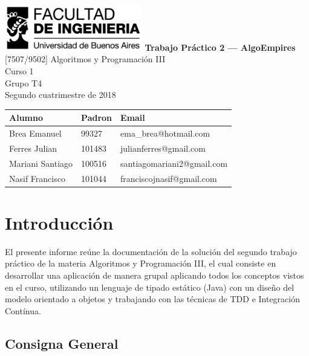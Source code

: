 \documentclass[titlepage,a4paper]{article}
\begin{document}
\begin{titlepage} %
	\hfill\includegraphics[width=6cm]{logofiuba.jpg}
    \centering
    \vfill
    \Huge \textbf{Trabajo Práctico 2 — AlgoEmpires}
    \vskip2cm
    \Large [7507/9502] Algoritmos y Programación III\\
    Curso 1 \\ %
    Grupo T4 \\
    Segundo cuatrimestre de 2018 
    \vfill 
   
    \begin{tabular}{|l|l|l|}
    		\hline
    		Alumno           & Padron & Email                      \\ \hline
    		Brea Emanuel     & 99327  & ema\_brea@hotmail.com      \\ \hline
    		Ferres Julian    & 101483 & julianferres@gmail.com     \\ \hline
    		Mariani Santiago & 100516 & santiagomariani2@gmail.com \\ \hline
    		Nasif  Francisco & 101044 & franciscojnasif@gmail.com  \\ \hline
    \end{tabular}  
  	  	
    \vfill
    \vfill
\end{titlepage}

\tableofcontents %
\newpage

\section{Introducción}\label{sec:intro}
El presente informe reúne la documentación de la solución del segundo trabajo práctico de la materia Algoritmos y Programación III, el cual consiste en desarrollar una aplicación de manera grupal aplicando todos los conceptos vistos en el curso, utilizando un lenguaje de tipado estático (Java) con un diseño del modelo orientado a objetos y trabajando con las técnicas de TDD e Integración Contínua.


\subsection{Consigna General}
\end{document}
